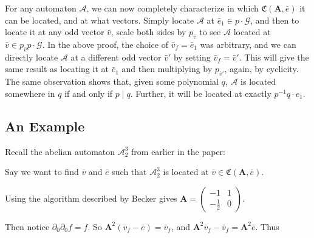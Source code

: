 \documentclass[runningheads]{llncs}
\newcommand{\A}{\mathcal{A}}
\newcommand{\G}{\mathcal{G}}
\newcommand{\C}{\mathfrak{C}(\Am,\e)}
\newcommand{\2}{\textbf{2}}
\newcommand{\Am}{\textbf{A}}
\newcommand{\del}{\partial}
\newcommand{\vv}{\bar{v}}
\newcommand{\e}{\bar{e}}
\begin{document}
For any automaton $\A$, we can now completely characterize in
which $\C$ it can be located, and at what vectors.
Simply locate $\A$ at $\e_1 \in p \cdot \G$, and then to locate it at
any odd vector $\vv$, scale both sides by $p_{\vv}$ to see $\A$ located at
$\vv \in p_{\vv} p \cdot \G$. 
In the above proof, the choice of $\vv_f = \e_1$ was arbitrary, and we can
directly locate $\A$ at a different odd vector $\vv'$ by setting 
$\vv_f = \vv'$. This will give the same result as locating it at $\e_1$ and 
then multiplying by $p_{\vv'}$, again, by cyclicity.
The same observation shows that, given some polynomial $q$, 
$\A$ is located somewhere in $q$ if and only if $p \mid q$. 
Further, it will be located at exactly $p^{-1}q \cdot e_1$.

\subsection{An Example}
Recall the abelian automaton $\A^3_2$ from earlier in the paper:

\begin{center}
\end{center}

Say we want to find $\vv$ and $\e$ such that $\A^3_2$ is located at 
$\vv \in \C$.

Using the algorithm described by Becker \cite{Becker18:thesis} gives 
$\Am = \begin{pmatrix} -1 & 1 \\ -\frac{1}{2} & 0 \end{pmatrix}$.

Then notice $\del_0 \del_0 f = f$.
So $\Am^2 (\vv_f - \e) = \vv_f$, and
$\Am^2 \vv_f - \vv_f = \Am^2 \e$. Thus
\end{document}
